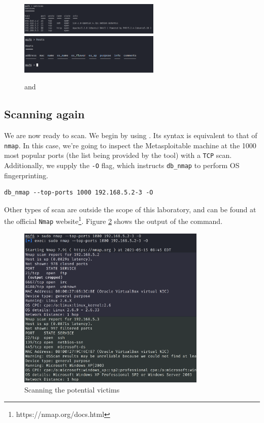 \begin{figure}[htbp]
	    \centering
	    \includegraphics[width=0.6\textwidth]{../drawable/exercise_2_screenshots/services_before.png}
	    \includegraphics[width=0.6\textwidth]{../drawable/exercise_2_screenshots/hosts_empty.png}
	    \caption{ and }
    \label{fig:ex2:services_hosts}
\end{figure}

\subsection{Scanning again}
\label{subsec:ex2:scanning-again}

We are now ready to scan. We begin by using . Its syntax is equivalent to that of \texttt{nmap}. In this case, we're going to inspect the Metasploitable machine at the 1000 most popular ports (the list being provided by the tool) with a \texttt{TCP} scan. Additionally, we supply the \texttt{-O} flag, which instructs \texttt{db\_nmap} to perform OS fingerprinting.

\begin{lstlisting}
db_nmap --top-ports 1000 192.168.5.2-3 -O
\end{lstlisting}

Other types of scan are outside the scope of this laboratory, and can be found at the official \texttt{Nmap} website\footnote{https://nmap.org/docs.html}. Figure \ref{fig:ex2:db_nmap} shows the output of the command.

\begin{figure}[htbp]
    \centering
    \includegraphics[width=0.8\textwidth]{../drawable/exercise_2_screenshots/db_nmap_v2.png}
    \caption{Scanning the potential victims}
    \label{fig:ex2:db_nmap}
\end{figure}

